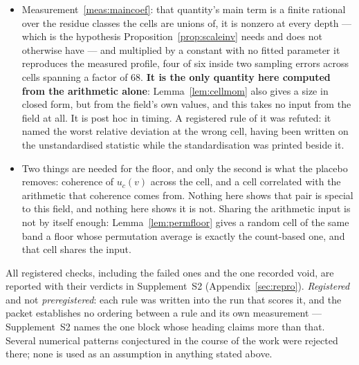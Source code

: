 \documentclass[11pt,a4paper]{article}
\theoremstyle{plain}
\theoremstyle{definition}
\theoremstyle{remark}
\begin{document}
\begin{itemize}
\item Measurement~\ref{meas:maincoef}: that quantity's main term is a
finite rational over the residue classes the cells are unions of, it
is nonzero at every depth --- which is the hypothesis
Proposition~\ref{prop:scaleinv} needs and does not otherwise have ---
and multiplied by a constant with no fitted parameter it reproduces
the measured profile, four of six inside two sampling errors across
cells spanning a factor of $68$. \textbf{It is the only quantity here
computed from the arithmetic alone}: Lemma~\ref{lem:cellmom} also
gives a size in closed form, but from the field's own values, and this
takes no input from the field at all. It is post hoc in timing. A registered rule of it was refuted: it named the worst
relative deviation at the wrong cell, having been written on the
unstandardised statistic while the standardisation was printed beside
it.

\item Two things are needed for the floor, and only the second is what
the placebo removes: coherence of $u_c(v)$ across the cell, and a cell
correlated with the arithmetic that coherence comes from. Nothing here
shows that pair is special to this field, and nothing here shows it is
not. Sharing the arithmetic input is
not by itself enough: Lemma~\ref{lem:permfloor} gives a random cell of
the same band a floor whose permutation average is exactly the
count-based one, and that cell shares the input.
\end{itemize}

All registered checks, including the failed ones and the one
recorded void, are reported with their verdicts in Supplement~S2
(Appendix~\ref{sec:repro}). \emph{Registered} and not
\emph{preregistered}: each rule was written into the run that scores it,
and the packet establishes no ordering between a rule and its own
measurement --- Supplement~S2 names the one block whose heading claims
more than that. Several numerical patterns conjectured in
the course of the work were rejected there; none is used as an
assumption in anything stated above.
\end{document}
